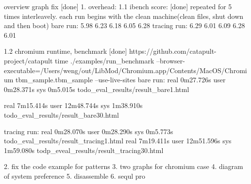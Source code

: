 overview graph fix [done]
1. overhead:
1.1 ibench score: [done]
   repeated for 5 times interleavely.
   each run begins with the clean machine(clean files, shut down and then boot)
   bare run: 5.98 6.23 6.18 6.05 6.28
   tracing run: 6.29 6.01 6.09 6.28 6.01

1.2 chromium runtime, benchmark [done]
https://github.com/catapult-project/catapult
time ./examples/run_benchmark --browser-executable=/Users/weng/out/LibMod/Chromium.app/Contents/MacOS/Chromium tbm_sample.tbm_sample --use-live-sites
bare run:
real	0m27.726s
user	0m28.371s
sys	0m5.015s
todo_eval_results/result_bare1.html

real	7m15.414s
user	12m48.744s
sys	1m38.910s
todo_eval_results/result_bare30.html

tracing run:
real	0m28.070s
user	0m28.290s
sys	0m5.773s
todo_eval_results/result_tracing1.html
real	7m19.411s
user	12m51.596s
sys	1m59.080s
todp_eveal_results/result_tracing30.html

2. fix the code example for patterns
3. two graphs for chromium case 
4. diagram of system preference
5. disassemble
6. sequl pro
   

